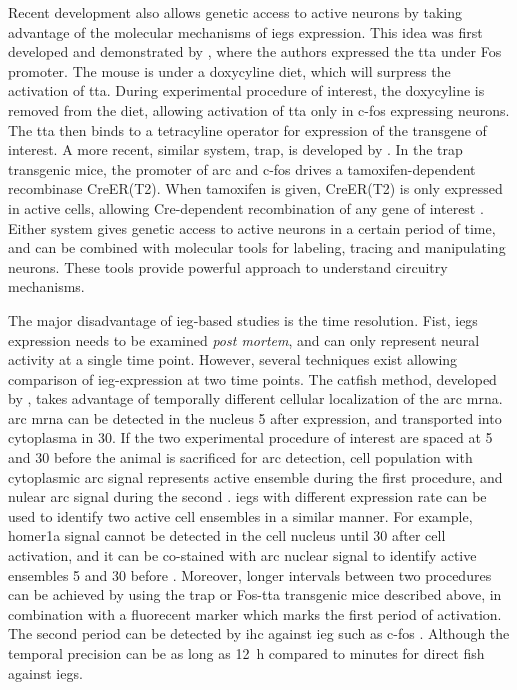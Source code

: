 Recent development also allows genetic access to active neurons by taking advantage of the molecular mechanisms of \glspl{ieg} expression. This idea was first developed and demonstrated by \citet{reijmers07}, where the authors expressed the \gls{tta} under Fos promoter. The mouse is under a doxycyline diet, which will surpress the activation of \gls{tta}. During experimental procedure of interest, the doxycyline is removed from the diet, allowing activation of \gls{tta} only in c-fos expressing neurons. The \gls{tta} then binds to a tetracyline operator for expression of the transgene of interest. A more recent, similar system, \gls{trap}, is developed by \citet{guenthner13}. In the \gls{trap} transgenic mice, the promoter of \gls{arc} and c-fos drives a tamoxifen-dependent recombinase CreER(T2). When tamoxifen is given, CreER(T2) is only expressed in active cells, allowing Cre-dependent recombination of any gene of interest \citep{guenthner13}. Either system gives genetic access to active neurons in a certain period of time, and can be combined with molecular tools for labeling, tracing and manipulating neurons. These tools provide powerful approach to understand circuitry mechanisms.

The major disadvantage of \gls{ieg}-based studies is the time resolution. Fist, \glspl{ieg} expression needs to be examined \textit{post mortem}, and can only represent neural activity at a single time point. However, several techniques exist allowing comparison of \gls{ieg}-expression at two time points. The \gls{catfish} method, developed by \citet{guzowski99}, takes advantage of temporally different cellular localization of the \gls{arc} \gls{mrna}. \Gls{arc} \gls{mrna} can be detected in the nucleus \SI{5}{\min} after expression, and transported into cytoplasma in \SI{30}{\min}. If the two experimental procedure of interest are spaced at \SI{5}{\min} and \SI{30}{\min} before the animal is sacrificed for \gls{arc} detection, cell population with cytoplasmic \gls{arc} signal represents active ensemble during the first procedure, and nulear \gls{arc} signal during the second \citep{guzowski99}. \Glspl{ieg} with different expression rate can be used to identify two active cell ensembles in a similar manner. For example, homer1a signal cannot be detected in the cell nucleus until \SI{30}{\min} after cell activation, and it can be co-stained with \gls{arc} nuclear signal to identify active ensembles \SI{5}{\min} and \SI{30}{\min} before \citep{vazdarjanova04}. Moreover, longer intervals between two procedures can be achieved by using the \gls{trap} or Fos-\gls{tta} transgenic mice described above, in combination with a fluorecent marker which marks the first period of activation. The second period can be detected by \gls{ihc} against \gls{ieg} such as c-fos \citep{reijmers07, guenthner13}. Although the temporal precision can be as long as \SI{12}{\hour} compared to minutes for direct \gls{fish} against \glspl{ieg}.

